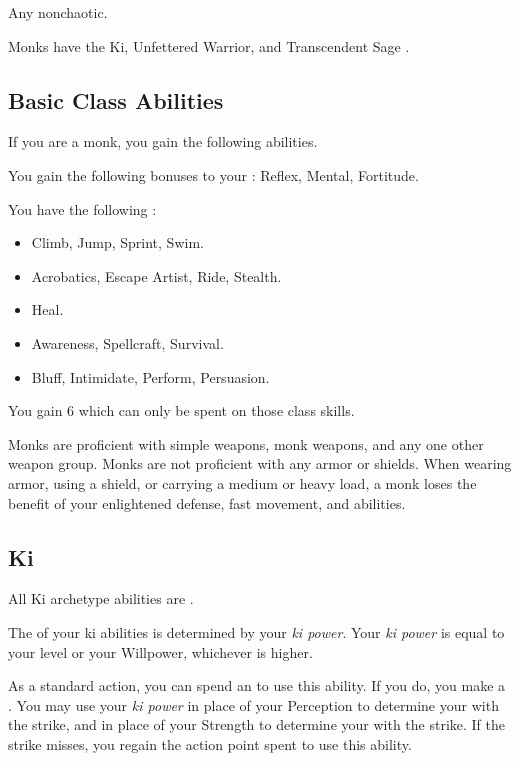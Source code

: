      Any nonchaotic.

     Monks have the Ki, Unfettered Warrior, and Transcendent Sage .

    \subsection{Basic Class Abilities}
        If you are a monk, you gain the following abilities.

        You gain the following bonuses to your :  Reflex,  Mental,  Fortitude.

        You have the following :
        \begin{itemize}
            \item {} Climb, Jump, Sprint, Swim.
            \item {} Acrobatics, Escape Artist, Ride, Stealth.
            \item {} Heal.
            \item {} Awareness, Spellcraft, Survival.
            \item {} Bluff, Intimidate, Perform, Persuasion.
        \end{itemize}
        You gain 6  which can only be spent on those class skills.

        Monks are proficient with simple weapons, monk weapons, and any one other weapon group.
        Monks are not proficient with any armor or shields.
        When wearing armor, using a shield, or carrying a medium or heavy load, a monk loses the benefit of your enlightened defense, fast movement, and \ki abilities.

    \subsection{Ki}
        All Ki archetype abilities are .

        The  of your ki abilities is determined by your \textit{ki power}.
        Your \textit{ki power} is equal to your level or your Willpower, whichever is higher.

        As a standard action, you can spend an  to use this ability.
        If you do, you make a .
        You may use your \textit{ki power} in place of your Perception to determine your  with the strike, and in place of your Strength to determine your  with the strike.
        If the strike misses, you regain the action point spent to use this ability.

